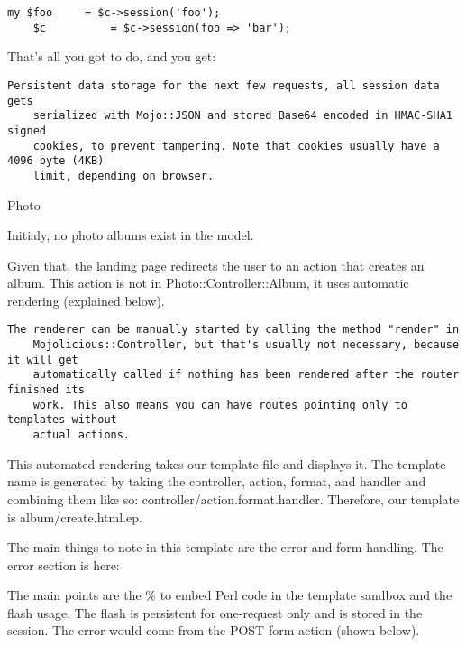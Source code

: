 \documentclass[14pt]{extreport}
\newcommand\Small{\fontsize{12}{13.0}\fontencoding{T1}\selectfont}
\newcommand*\LSTfont{\Small\ttfamily\SetTracking{encoding=*}{-60}\lsstyle}
\begin{document}
\begin{lstlisting}[style=BlockStyle]
    my $foo     = $c->session('foo');
    $c          = $c->session(foo => 'bar');
\end{lstlisting}

That's all you got to do, and you get:

\begin{lstlisting}[style=BlockStyle]
    Persistent data storage for the next few requests, all session data gets
    serialized with Mojo::JSON and stored Base64 encoded in HMAC-SHA1 signed
    cookies, to prevent tampering. Note that cookies usually have a 4096 byte (4KB)
    limit, depending on browser.
\end{lstlisting}

{\Large Photo}

Initialy, no photo albums exist in the model.

Given that, the landing page redirects the user to an action that creates an
album.  This action is not in Photo::Controller::Album, it uses automatic
rendering (explained below).

\begin{lstlisting}[style=BlockStyle]
    The renderer can be manually started by calling the method "render" in
    Mojolicious::Controller, but that's usually not necessary, because it will get
    automatically called if nothing has been rendered after the router finished its
    work. This also means you can have routes pointing only to templates without
    actual actions.
\end{lstlisting}

This automated rendering takes our template file and displays it.  The template
name is generated by taking the controller, action, format, and handler and
combining them like so: controller/action.format.handler.  Therefore, our
template is album/create.html.ep.

The main things to note in this template are the error and form handling.  The
error section is here:



The main points are the \% to embed Perl code in the template sandbox and the
flash usage.  The flash is persistent for one-request only and is stored in the
session.  The error would come from the POST form action (shown below).


\end{document}
